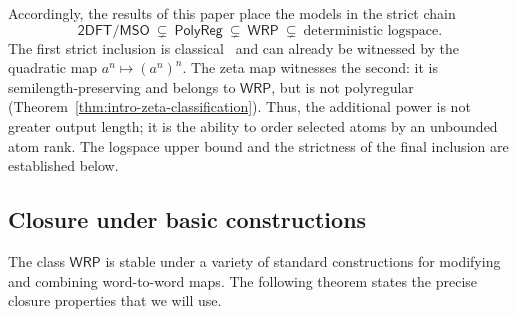 \documentclass[11pt]{article}
\theoremstyle{definition}
\newcommand{\WRP}{\mathsf{WRP}}
\newcommand{\TDFT}{\mathsf{2DFT}}
\newcommand{\MSO}{\mathsf{MSO}}
\newcommand{\polyreg}{\mathsf{PolyReg}}
\begin{document}
Accordingly, the results of this paper place the models in the strict chain
\[
   \TDFT/\MSO\ \subsetneq\ \polyreg\ \subsetneq\ \WRP
   \ \subsetneq\ \text{deterministic logspace}.
\]
The first strict inclusion is classical~\cite{Bojanczyk2018,
BojanczykKieferLhote2019} and can already be witnessed by the quadratic map
$a^n\mapsto(a^n)^n$.  The zeta map witnesses the second:
it is semilength-preserving and belongs to $\WRP$, but is not polyregular
(Theorem~\ref{thm:intro-zeta-classification}).  Thus, the additional power is
not greater output length; it is the ability to order selected atoms by an
unbounded atom rank.  The logspace upper bound and the strictness of the final
inclusion are established below.


\subsection{Closure under basic constructions}

The class $\WRP$ is stable under a variety of standard constructions for
modifying and combining word-to-word maps.  The following theorem states the
precise closure properties that we will use.
\end{document}
